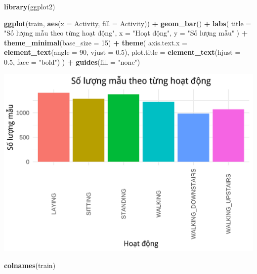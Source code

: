 \documentclass[
]{article}
\newenvironment{Shaded}{\begin{snugshade}}{\end{snugshade}}
\newcommand{\AttributeTok}[1]{\textcolor[rgb]{0.13,0.29,0.53}{#1}}
\newcommand{\DecValTok}[1]{\textcolor[rgb]{0.00,0.00,0.81}{#1}}
\newcommand{\FloatTok}[1]{\textcolor[rgb]{0.00,0.00,0.81}{#1}}
\newcommand{\FunctionTok}[1]{\textcolor[rgb]{0.13,0.29,0.53}{\textbf{#1}}}
\newcommand{\NormalTok}[1]{#1}
\newcommand{\SpecialCharTok}[1]{\textcolor[rgb]{0.81,0.36,0.00}{\textbf{#1}}}
\newcommand{\StringTok}[1]{\textcolor[rgb]{0.31,0.60,0.02}{#1}}
\begin{document}
\begin{Shaded}
\begin{Highlighting}[]
\FunctionTok{library}\NormalTok{(ggplot2)}

\FunctionTok{ggplot}\NormalTok{(train, }\FunctionTok{aes}\NormalTok{(}\AttributeTok{x =}\NormalTok{ Activity, }\AttributeTok{fill =}\NormalTok{ Activity)) }\SpecialCharTok{+}
  \FunctionTok{geom\_bar}\NormalTok{() }\SpecialCharTok{+}
  \FunctionTok{labs}\NormalTok{(}
    \AttributeTok{title =} \StringTok{"Số lượng mẫu theo từng hoạt động"}\NormalTok{,}
    \AttributeTok{x =} \StringTok{"Hoạt động"}\NormalTok{,}
    \AttributeTok{y =} \StringTok{"Số lượng mẫu"}
\NormalTok{  ) }\SpecialCharTok{+}
  \FunctionTok{theme\_minimal}\NormalTok{(}\AttributeTok{base\_size =} \DecValTok{15}\NormalTok{) }\SpecialCharTok{+}
  \FunctionTok{theme}\NormalTok{(}
    \AttributeTok{axis.text.x =} \FunctionTok{element\_text}\NormalTok{(}\AttributeTok{angle =} \DecValTok{90}\NormalTok{, }\AttributeTok{vjust =} \FloatTok{0.5}\NormalTok{),}
    \AttributeTok{plot.title =} \FunctionTok{element\_text}\NormalTok{(}\AttributeTok{hjust =} \FloatTok{0.5}\NormalTok{, }\AttributeTok{face =} \StringTok{"bold"}\NormalTok{)}
\NormalTok{  ) }\SpecialCharTok{+}
  \FunctionTok{guides}\NormalTok{(}\AttributeTok{fill =} \StringTok{"none"}\NormalTok{)}
\end{Highlighting}
\end{Shaded}

\includegraphics{report_files/figure-latex/unnamed-chunk-7-1.pdf}

\begin{Shaded}
\begin{Highlighting}[]
\FunctionTok{colnames}\NormalTok{(train)}
\end{Highlighting}
\end{Shaded}
\end{document}
